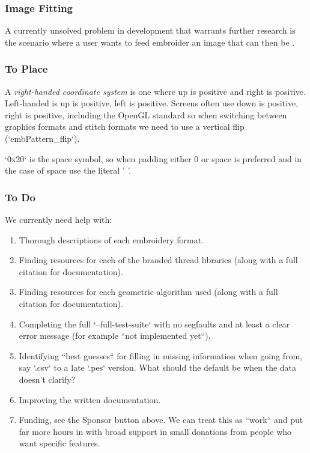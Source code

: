 \documentclass[a4paper, 11pt]{report}
\begin{document}
\subsubsection{Image Fitting}

A currently unsolved problem in development that warrants further research is
the scenario where a user wants to feed embroider an image that can then be .

\subsubsection{To Place}

A \emph{right-handed coordinate system} is one where up is positive and right is
positive. Left-handed is up is positive, left is positive. Screens often use
down is positive, right is positive, including the OpenGL standard so when
switching between graphics formats and stitch formats we need to use a vertical
flip (`embPattern\_flip`).

`0x20` is the space symbol, so when padding either 0 or space is preferred and in the case of space use the literal ' '.

\subsubsection{To Do}

We currently need help with:

\begin{enumerate}
\item Thorough descriptions of each embroidery format.
\item Finding resources for each of the branded thread libraries (along with a full citation for documentation).
\item Finding resources for each geometric algorithm used (along with a full citation for documentation).
\item Completing the full `--full-test-suite`  with no segfaults and at least a clear error message (for example ``not implemented yet``).
\item Identifying ``best guesses`` for filling in missing information when going from, say `.csv` to a late `.pes` version. What should the default be when the data doesn't clarify?
\item Improving the written documentation.
\item Funding, see the Sponsor button above. We can treat this as ``work`` and put far more hours in with broad support in small donations from people who want specific features.
\end{enumerate}
\end{document}
